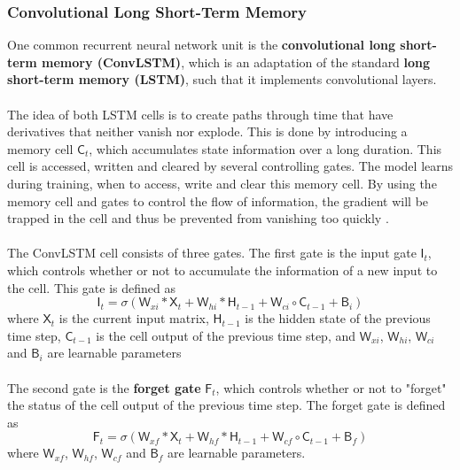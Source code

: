 \documentclass[./main.tex]{subfiles}
\begin{document}
\subsubsection{Convolutional Long Short-Term Memory}
One common recurrent neural network unit is the \textbf{convolutional long short-term memory (ConvLSTM)}, which is an adaptation of the standard \textbf{long short-term memory (LSTM)}, such that it implements convolutional layers. 
\\
\\
\noindent The idea of both LSTM cells is to create paths through time that have derivatives that neither vanish nor explode. This is done by introducing a memory cell $\mathsf{C}_t$, which accumulates state information over a long duration. This cell is accessed, written and cleared by several controlling gates. The model learns during training, when to access, write and clear this memory cell. By using the memory cell and gates to control the flow of information, the gradient will be trapped in the cell and thus be prevented from vanishing too quickly \cite{DL_book,conv_lstm}.
\\
\\
The ConvLSTM cell consists of three gates. The first gate is the input gate $\mathsf{I}_t$, which controls whether or not to accumulate the information of a new input to the cell. This gate is defined as
\begin{equation}
    \mathsf{I}_t = \sigma \left( \mathsf{W}_{xi} * \mathsf{X}_t + \mathsf{W}_{hi} * \mathsf{H}_{t - 1} + \mathsf{W}_{ci} \circ \mathsf{C}_{t - 1} + \mathsf{B}_i \right)
\end{equation}
where $\mathsf{X}_t$ is the current input matrix, $\mathsf{H}_{t - 1}$ is the hidden state of the previous time step, $\mathsf{C}_{t - 1}$ is the cell output of the previous time step, and $\mathsf{W}_{xi}$, $\mathsf{W}_{hi}$, $\mathsf{W}_{ci}$ and $\mathsf{B}_i$ are learnable parameters
\\
\\
The second gate is the \textbf{forget gate} $\mathsf{F}_t$, which controls whether or not to "forget" the status of the cell output of the previous time step. The forget gate is defined as
\begin{equation}
    \mathsf{F}_t = \sigma \left( \mathsf{W}_{xf} * \mathsf{X}_t + \mathsf{W}_{hf} * \mathsf{H}_{t - 1} + \mathsf{W}_{cf} \circ \mathsf{C}_{t - 1} + \mathsf{B}_f \right)
\end{equation}
where $\mathsf{W}_{xf}$, $\mathsf{W}_{hf}$, $\mathsf{W}_{cf}$ and $\mathsf{B}_f$ are learnable parameters.
\end{document}
